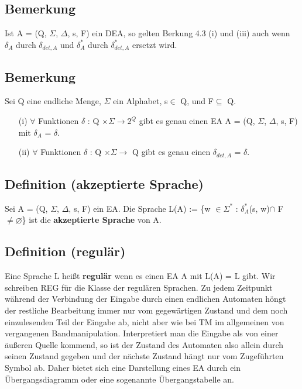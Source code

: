 \subsection{Bemerkung }
Ist A = (Q, $\Sigma$, $\Delta$, s, F) ein DEA, so gelten Berkung 4.3 (i) und (iii) auch wenn $\delta_{A}$ durch $\delta_{det, A}$ und $\delta_{A}^{*}$ durch $\delta_{det, A}^{*}$ ersetzt wird.

\subsection{Bemerkung}
Sei Q eine endliche Menge, $\Sigma$ ein Alphabet, s$\in$ Q, und F$\subseteq$ Q. 

\begin{itemize}
    \item [(i)] $\forall$ Funktionen $\delta$ : Q $\times \Sigma \rightarrow 2^{Q}$ gibt es genau einen EA A = (Q, $\Sigma$, $\Delta$, s, F) mit $\delta_{A}$ = $\delta$.
    \item [(ii)] $\forall$ Funktionen $\delta$ : Q $\times \Sigma \rightarrow$ Q gibt es genau einen $\delta_{det, A}$ = $\delta$. 
\end{itemize}

\subsection{Definition (akzeptierte Sprache)}
Sei A = (Q, $\Sigma$, $\Delta$, s, F) ein EA. Die Sprache L(A) := \{w $\in \Sigma^{*}$ : $\delta_{A}^{*}$(s, w)$\cap$ F $\neq \varnothing $\} ist die \textbf{akzeptierte Sprache} von A.

\subsection{Definition (regulär)} 
Eine Sprache L heißt \textbf{regulär} wenn es einen EA A mit L(A) = L gibt. Wir schreiben REG für die Klasse der regulären Sprachen. Zu jedem Zeitpunkt während der Verbindung der Eingabe durch einen endlichen Automaten höngt der restliche Bearbeitung immer nur vom gegewärtigen Zustand und dem noch einzulesenden Teil der Eingabe ab, nicht aber wie bei TM im allgemeinen von vergangenen Bandmanipulation. Interpretiert man die Eingabe als von einer äußeren Quelle kommend, so ist der  Zustand des Automaten also allein durch seinen Zustand gegeben und der nächste Zustand hängt nur vom Zugeführten Symbol ab. Daher bietet sich eine Darstellung eines EA durch ein Übergangsdiagramm oder eine sogenannte Übergangstabelle an.

